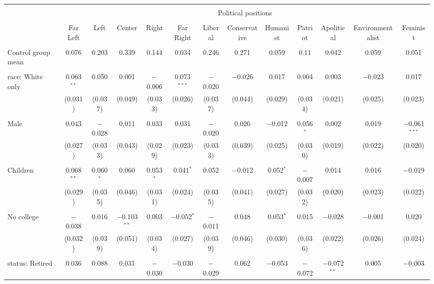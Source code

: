 
\begin{tabular}{@{\extracolsep{5pt}}lcccccccccccc} 
\\[-1.8ex]\hline 
\hline \\[-1.8ex] 
 & \multicolumn{12}{c}{Political positions} \\ 
\cline{2-13} 
\\[-1.8ex] & Far Left & Left & Center & Right & Far Right & Liberal & Conservative & Humanist & Patriot & Apolitical & Environmentalist & Feminist \\ 
\hline \\[-1.8ex] 
 Control group mean & 0.076 & 0.203 & 0.339 & 0.144 & 0.034 & 0.246 & 0.271 & 0.059 & 0.11 & 0.042 & 0.059 & 0.051  \\ \hline \\[-1.8ex] race: White only & 0.063$^{**}$ & 0.050 & 0.001 & $-$0.006 & 0.073$^{***}$ & $-$0.020 & $-$0.026 & 0.017 & 0.004 & 0.003 & $-$0.023 & 0.017 \\ 
  & (0.031) & (0.037) & (0.049) & (0.033) & (0.026) & (0.037) & (0.044) & (0.029) & (0.034) & (0.021) & (0.025) & (0.023) \\ 
  & & & & & & & & & & & & \\ 
 Male & 0.043 & $-$0.028 & 0.011 & 0.033 & 0.031 & $-$0.020 & 0.026 & $-$0.012 & 0.056$^{*}$ & 0.002 & 0.019 & $-$0.061$^{***}$ \\ 
  & (0.027) & (0.033) & (0.043) & (0.029) & (0.023) & (0.033) & (0.039) & (0.025) & (0.030) & (0.019) & (0.022) & (0.020) \\ 
  & & & & & & & & & & & & \\ 
 Children & 0.068$^{**}$ & 0.060$^{*}$ & 0.060 & 0.053$^{*}$ & 0.041$^{*}$ & 0.052 & $-$0.012 & 0.052$^{*}$ & $-$0.007 & 0.014 & 0.016 & $-$0.019 \\ 
  & (0.029) & (0.035) & (0.046) & (0.031) & (0.024) & (0.035) & (0.041) & (0.027) & (0.032) & (0.020) & (0.023) & (0.022) \\ 
  & & & & & & & & & & & & \\ 
 No college & $-$0.038 & 0.016 & $-$0.103$^{**}$ & 0.003 & $-$0.052$^{*}$ & $-$0.011 & 0.048 & 0.053$^{*}$ & 0.015 & $-$0.028 & $-$0.001 & 0.020 \\ 
  & (0.032) & (0.039) & (0.051) & (0.034) & (0.027) & (0.039) & (0.046) & (0.030) & (0.036) & (0.022) & (0.026) & (0.024) \\ 
  & & & & & & & & & & & & \\ 
 status: Retired & 0.036 & 0.088 & 0.031 & $-$0.030 & $-$0.030 & $-$0.029 & 0.062 & $-$0.053 & $-$0.072 & $-$0.072$^{**}$ & 0.005 & $-$0.003 \\ 

\end{tabular}
